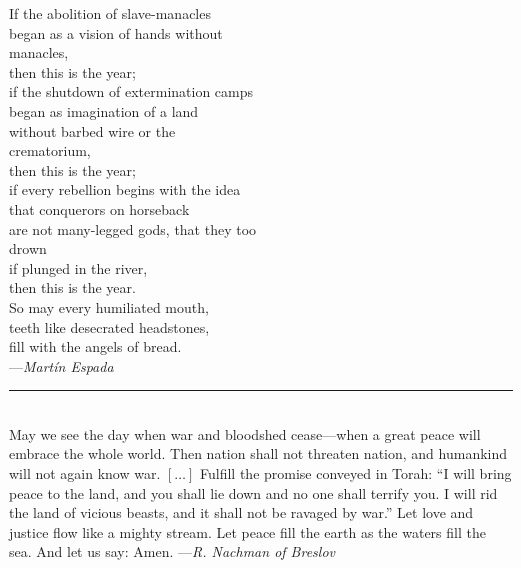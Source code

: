 \documentclass[a4paper,12pt,openany]{memoir}
\newcommand{\HgEllipsis}{\ensuremath{\left[\ldots\right]}}
\newcommand{\HgSource}[1]{\hfill{\small---\itshape{#1}}}
\newcommand{\HgFill}{\vfill \hrule \vfill}
\newenvironment{HgEnglish}{\strut\\\noindent}{\vspace{1em}}
\begin{document}
\begin{multicols}{2}
\noindent
If the abolition of slave-manacles \\
began as a vision of hands without \\
\vin manacles, \\
then this is the year; \\
if the shutdown of extermination camps \\
began as imagination of a land \\
without barbed wire or the \\
\vin crematorium, \\
then this is the year; \\
if every rebellion begins with the idea \\
that conquerors on horseback \\
are not many-legged gods, that they too \\
\vin drown \\
if plunged in the river, \\
then this is the year. \\
 
\noindent
So may every humiliated mouth, \\
teeth like desecrated headstones, \\
fill with the angels of bread.\\

\HgSource{Mart\'in Espada}
\end{multicols}

\HgFill

\begin{HgEnglish}
  \small
May we see the day when war and bloodshed cease---when a great peace will
embrace the whole world.  Then nation shall not threaten nation, and humankind
will not again know war. \HgEllipsis{}
Fulfill the promise conveyed in Torah: ``I will bring peace to the
land, and you shall lie down and no one shall terrify you.  I will rid the land
of vicious beasts, and it shall not be ravaged by war.'' Let love and justice
flow like a mighty stream.  Let peace fill the earth as the waters fill the sea.
And let us say: Amen. \HgSource{R. Nachman of Breslov}
\end{HgEnglish}
\end{document}
